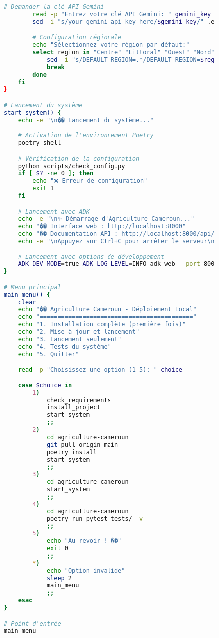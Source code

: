 \begin{figure}[h]
\begin{lstlisting}[language=bash, caption=Script de déploiement local automatisé]
        # Demander la clé API Gemini
        read -p "Entrez votre clé API Gemini: " gemini_key
        sed -i "s/your_gemini_api_key_here/$gemini_key/" .env

        # Configuration régionale
        echo "Sélectionnez votre région par défaut:"
        select region in "Centre" "Littoral" "Ouest" "Nord" "Sud" "Est"; do
            sed -i "s/DEFAULT_REGION=.*/DEFAULT_REGION=$region/" .env
            break
        done
    fi
}

# Lancement du système
start_system() {
    echo -e "\n�� Lancement du système..."

    # Activation de l'environnement Poetry
    poetry shell

    # Vérification de la configuration
    python scripts/check_config.py
    if [ $? -ne 0 ]; then
        echo "❌ Erreur de configuration"
        exit 1
    fi

    # Lancement avec ADK
    echo -e "\n✨ Démarrage d'Agriculture Cameroun..."
    echo "�� Interface web : http://localhost:8000"
    echo "�� Documentation API : http://localhost:8000/api/docs"
    echo -e "\nAppuyez sur Ctrl+C pour arrêter le serveur\n"

    # Lancement avec options de développement
    ADK_DEV_MODE=true ADK_LOG_LEVEL=INFO adk web --port 8000 --reload
}

# Menu principal
main_menu() {
    clear
    echo "�� Agriculture Cameroun - Déploiement Local"
    echo "==========================================="
    echo "1. Installation complète (première fois)"
    echo "2. Mise à jour et lancement"
    echo "3. Lancement seulement"
    echo "4. Tests du système"
    echo "5. Quitter"

    read -p "Choisissez une option (1-5): " choice

    case $choice in
        1)
            check_requirements
            install_project
            start_system
            ;;
        2)
            cd agriculture-cameroun
            git pull origin main
            poetry install
            start_system
            ;;
        3)
            cd agriculture-cameroun
            start_system
            ;;
        4)
            cd agriculture-cameroun
            poetry run pytest tests/ -v
            ;;
        5)
            echo "Au revoir ! ��"
            exit 0
            ;;
        *)
            echo "Option invalide"
            sleep 2
            main_menu
            ;;
    esac
}

# Point d'entrée
main_menu
\end{lstlisting}
\end{figure}

